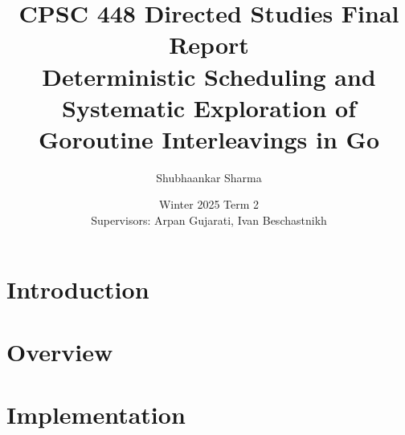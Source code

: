 \documentclass[11pt]{article}
\title{CPSC 448 Directed Studies Final Report\\
  Deterministic Scheduling and Systematic Exploration of
  Goroutine Interleavings in Go}
\author{Shubhaankar Sharma}
\date{Winter 2025 Term 2\\Supervisors: Arpan Gujarati, Ivan Beschastnikh}
\theoremstyle{definition}
\begin{document}
\maketitle

\begin{abstract}
\end{abstract}

\section{Introduction}

\section{Overview}

\section{Implementation}
\end{document}
